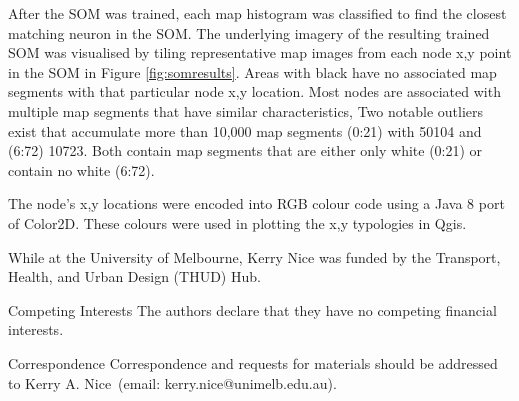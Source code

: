 \documentclass{nature}
\begin{document}
\begin{methods}
After the SOM was trained, each map histogram was classified to find the closest matching neuron in the SOM. The underlying imagery of the resulting trained SOM was visualised by tiling representative map images from each node x,y point in the SOM in Figure \ref{fig:somresults}. Areas with black have no associated map segments with that particular node x,y location. Most nodes are associated with multiple map segments that have similar characteristics, %
Two notable outliers exist that accumulate more than 10,000 map segments (0:21) with 50104 and (6:72) 10723. Both contain map segments that are either only white (0:21) or contain no white (6:72).





The node's x,y locations were encoded into RGB colour code using a Java 8 port of Color2D\cite{Jackle2017,Steiger2015}. These colours were used in plotting the x,y typologies in Qgis\cite{QGIS2009}.









\end{methods}








\begin{addendum}
 \item While at the University of Melbourne, Kerry Nice was funded by the Transport, Health, and Urban Design (THUD) Hub.
 \item[Competing Interests] The authors declare that they have no
competing financial interests.
 \item[Correspondence] Correspondence and requests for materials
should be addressed to Kerry A. Nice~(email: kerry.nice@unimelb.edu.au).
\end{addendum}
\end{document}
